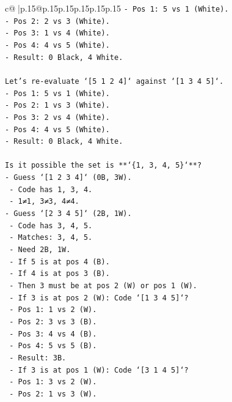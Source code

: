 \documentclass{article}
\begin{document}
{\begin{supertabular}{c@{$\;$}|p{.15\linewidth}@{}p{.15\linewidth}p{.15\linewidth}p{.15\linewidth}p{.15\linewidth}p{.15\linewidth}}
{{{\texttt{{-} Pos 1: 5 vs 1 (White).} \\
\texttt{{-} Pos 2: 2 vs 3 (White).} \\
\texttt{{-} Pos 3: 1 vs 4 (White).} \\
\texttt{{-} Pos 4: 4 vs 5 (White).} \\
\texttt{{-} Result: 0 Black, 4 White.} \\
\\ 
\texttt{Let's re{-}evaluate `{[}5 1 2 4{]}` against `{[}1 3 4 5{]}`.} \\
\texttt{{-} Pos 1: 5 vs 1 (White).} \\
\texttt{{-} Pos 2: 1 vs 3 (White).} \\
\texttt{{-} Pos 3: 2 vs 4 (White).} \\
\texttt{{-} Pos 4: 4 vs 5 (White).} \\
\texttt{{-} Result: 0 Black, 4 White.} \\
\\ 
\texttt{Is it possible the set is **`\{1, 3, 4, 5\}`**?} \\
\texttt{{-} Guess `{[}1 2 3 4{]}` (0B, 3W).} \\
\texttt{  {-} Code has 1, 3, 4.} \\
\texttt{  {-} 1≠1, 3≠3, 4≠4.} \\
\texttt{{-} Guess `{[}2 3 4 5{]}` (2B, 1W).} \\
\texttt{  {-} Code has 3, 4, 5.} \\
\texttt{  {-} Matches: 3, 4, 5.} \\
\texttt{  {-} Need 2B, 1W.} \\
\texttt{  {-} If 5 is at pos 4 (B).} \\
\texttt{  {-} If 4 is at pos 3 (B).} \\
\texttt{  {-} Then 3 must be at pos 2 (W) or pos 1 (W).} \\
\texttt{  {-} If 3 is at pos 2 (W): Code `{[}1 3 4 5{]}`?} \\
\texttt{    {-} Pos 1: 1 vs 2 (W).} \\
\texttt{    {-} Pos 2: 3 vs 3 (B).} \\
\texttt{    {-} Pos 3: 4 vs 4 (B).} \\
\texttt{    {-} Pos 4: 5 vs 5 (B).} \\
\texttt{    {-} Result: 3B.} \\
\texttt{  {-} If 3 is at pos 1 (W): Code `{[}3 1 4 5{]}`?} \\
\texttt{    {-} Pos 1: 3 vs 2 (W).} \\
\texttt{    {-} Pos 2: 1 vs 3 (W).} \\
}}}
\end{supertabular}}
\end{document}
